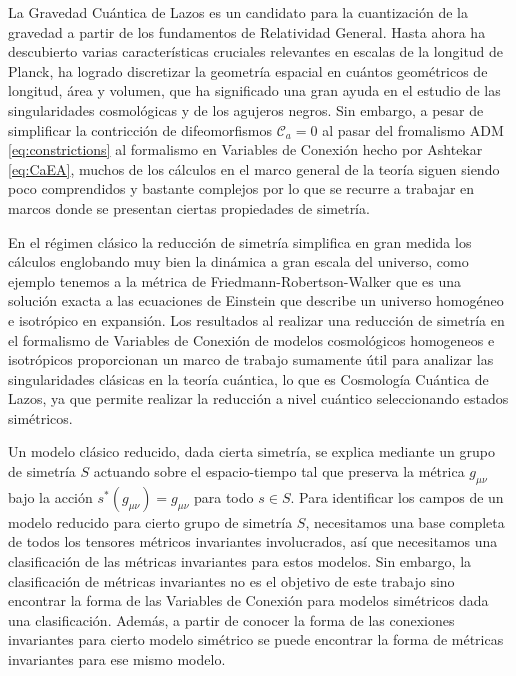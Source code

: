 La Gravedad Cu\'{a}ntica de Lazos es un candidato para la cuantizaci\'{o}n de la gravedad a partir de los fundamentos de Relatividad General. Hasta ahora ha descubierto varias caracter\'{i}sticas cruciales relevantes en escalas de la longitud de Planck, ha logrado discretizar la geometr\'{i}a espacial en cu\'{a}ntos geom\'{e}tricos de longitud, \'{a}rea y volumen, que ha significado una gran ayuda en el estudio de las singularidades cosmol\'{o}gicas y de los agujeros negros. Sin embargo, a pesar de simplificar la contricci\'{o}n de difeomorfismos $\mathcal{C}_{a} = 0$ al pasar del fromalismo ADM \eqref{eq:constrictions} al formalismo en Variables de Conexi\'{o}n hecho por Ashtekar \eqref{eq:CaEA}, muchos de los c\'{a}lculos en el marco general de la teor\'{i}a siguen siendo poco comprendidos y bastante complejos por lo que se recurre a trabajar en marcos donde se presentan ciertas propiedades de simetr\'{i}a.

En el r\'{e}gimen cl\'{a}sico la reducci\'{o}n de simetr\'{i}a simplifica en gran medida los c\'{a}lculos englobando muy bien la din\'{a}mica a gran escala del universo, como ejemplo tenemos a la m\'{e}trica de Friedmann-Robertson-Walker que es una soluci\'{o}n exacta a las ecuaciones de Einstein que describe un universo homog\'{e}neo e isotr\'{o}pico en expansi\'{o}n. Los resultados al realizar una reducci\'{o}n de simetr\'{i}a en el formalismo de Variables de Conexi\'{o}n de modelos cosmol\'{o}gicos homogeneos e isotr\'{o}picos proporcionan un marco de trabajo sumamente \'{u}til para analizar las singularidades cl\'{a}sicas en la teor\'{i}a cu\'{a}ntica, lo que es Cosmolog\'{i}a Cu\'{a}ntica de Lazos, ya que permite realizar la reducci\'{o}n a nivel cu\'{a}ntico seleccionando estados sim\'{e}tricos.

Un modelo cl\'{a}sico reducido, dada cierta simetr\'{i}a, se explica mediante un grupo de simetr\'{i}a $S$ actuando sobre el espacio-tiempo tal que preserva la m\'{e}trica $g_{\mu \nu}$ bajo la acci\'{o}n $s^{*}(g_{\mu \nu}) = g_{\mu \nu}$ para todo $s \in S$. {\color{red}Para identificar los campos de un modelo reducido para cierto grupo de simetr\'{i}a $S$, necesitamos una base completa de todos los tensores m\'{e}tricos invariantes involucrados, as\'{i} que necesitamos una clasificaci\'{o}n de las m\'{e}tricas invariantes para estos modelos.} Sin embargo, la clasificaci\'{o}n de m\'{e}tricas invariantes no es el objetivo de este trabajo sino encontrar la forma de las Variables de Conexi\'{o}n para modelos sim\'{e}tricos dada una clasificaci\'{o}n. Adem\'{a}s, a partir de conocer la forma de las conexiones invariantes para cierto modelo sim\'{e}trico se puede encontrar la forma de m\'{e}tricas invariantes para ese mismo modelo.

